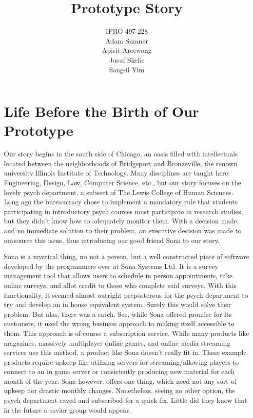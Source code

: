 \documentclass[12pt]{article}
\title{\textbf{Prototype Story}}
\author{IPRO 497-228 \vspace{1cm}\\ Adam Sumner\\ Apisit Areewong\\Jusuf Skelic\\ Sang-il Yim }
\date{}
\begin{document}
\maketitle

\section*{Life Before the Birth of Our Prototype}
Our story begins in the south side of Chicago, an oasis filled with intellectuals located between the neighborhoods of Bridgeport and Bronzeville, the renown university Illinois Institute of Technology. Many disciplines are taught here: Engineering, Design, Law, Computer Science, etc., but our story focuses on the lovely psych department, a subsect of The Lewis College of Human Sciences. Long ago the bureaucracy chose to implement a mandatory rule that students participating in introductory psych courses must participate in research studies, but they didn't know how to adequately monitor them. With a decision made, and no immediate solution to their problem, an executive decision was made to outsource this issue, thus introducing our good friend Sona to our story.

Sona is a mystical thing, no not a person, but a well constructed piece of software developed by the programmers over at Sona Systems Ltd. It is a survey management tool that allows users to schedule in person appointments, take online surveys, and allot credit to those who complete said surveys. With this functionality, it seemed almost outright preposterous for the psych department to try and develop an in house equivalent system. Surely this would solve their problem. But alas, there was a catch. See, while Sona offered promise for its customers, it used the wrong business approach to making itself accessible to them. This approach is of course a subscription service. While many products like magazines, massively multiplayer online games, and online media streaming services use this method, a product like Sona doesn't really fit in. These example products require upkeep like utilizing servers for streaming/allowing players to connect to an in game server or consistently producing new material for each month of the year. Sona however, offers one thing, which need not any sort of upkeep nor drastic monthly changes. Nonetheless, seeing no other option, the psych department caved and subscribed for a quick fix. Little did they know that in the future a savior group would appear.
\end{document}
